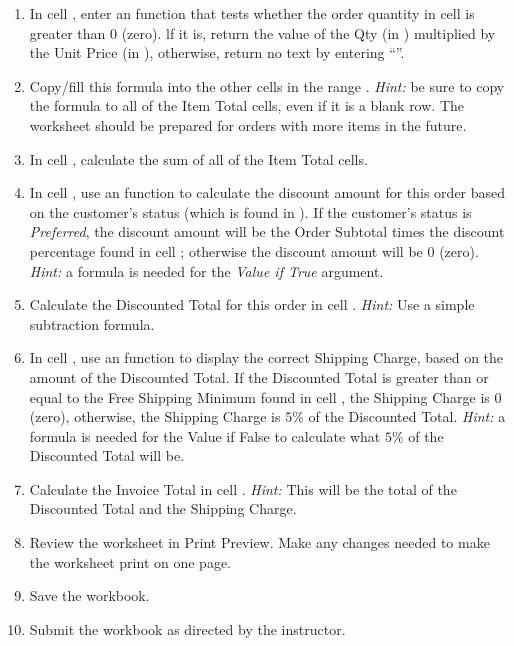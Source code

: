 \begin{enumerate}
\item In cell , enter an  function that tests whether the order quantity in cell  is greater than $ 0 $ (zero). lf it is, return the value of the Qty (in ) multiplied by the Unit Price (in ), otherwise, return no text by entering ``''.
\item Copy/fill this formula into the other cells in the range . \textit{Hint:} be sure to copy the formula to all of the Item Total cells, even if it is a blank row. The worksheet should be prepared for orders with more items in the future.
\item In cell , calculate the sum of all of the Item Total cells.
\item In cell , use an  function to calculate the discount amount for this order based on the customer's status (which is found in ). If the customer's status is \textit{Preferred}, the discount amount will be the Order Subtotal times the discount percentage found in cell ; otherwise the discount amount will be $ 0 $ (zero). \textit{Hint:} a formula is needed for the \textit{Value if True} argument.
\item Calculate the Discounted Total for this order in cell . \textit{Hint:} Use a simple subtraction formula.
\item In cell , use an  function to display the correct Shipping Charge, based on the amount of the Discounted Total. If the Discounted Total is greater than or equal to the Free Shipping Minimum found in cell , the Shipping Charge is $ 0 $ (zero), otherwise, the Shipping Charge is $ 5\% $ of the Discounted Total. \textit{Hint:} a formula is needed for the Value if False to calculate what $ 5\% $ of the Discounted Total will be.
\item Calculate the Invoice Total in cell . \textit{Hint:} This will be the total of the Discounted Total and the Shipping Charge.
\item Review the worksheet in Print Preview. Make any changes needed to make the worksheet print on one page.
\item Save the  workbook.
\item Submit the  workbook as directed by the instructor.
\end{enumerate}
